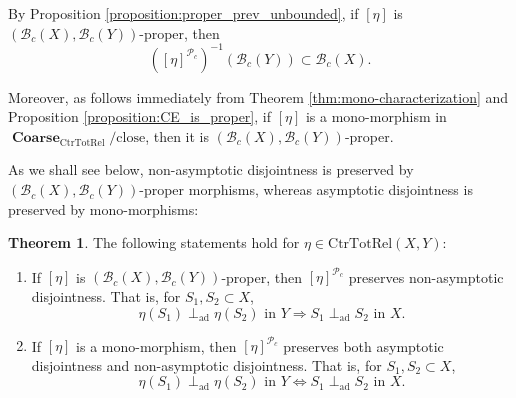 \documentclass[12pt, a4paper]{amsart}
\theoremstyle{definition}
\newtheorem{theorem}{Theorem}[section]
\newcommand{\Coarse}{\mathop{\mathbf{Coarse}}\nolimits}
\newcommand{\CtrTotRel}{\mathrm{CtrTotRel}}
\newcommand{\close}{\mathrm{close}}
\newcommand{\adperp}{\mathrel{\perp_{\mathrm{ad}}}}
\begin{document}
By Proposition \ref{proposition:proper_prev_unbounded}, if $[\eta]$ is $(\mathcal{B}_c(X),\mathcal{B}_c(Y))$-proper, then
\[
([\eta]^{\mathcal{P}_c})^{-1}(\mathcal{B}_c(Y)) \subset \mathcal{B}_c(X).
\]

Moreover, as follows immediately from Theorem \ref{thm:mono-characterization} and Proposition \ref{proposition:CE_is_proper}, if $[\eta]$ is a mono-morphism in $\Coarse_{\CtrTotRel}/{\close}$, then it is $(\mathcal{B}_c(X),\mathcal{B}_c(Y))$-proper.


As we shall see below, non-asymptotic disjointness is preserved by $(\mathcal{B}_c(X),\mathcal{B}_c(Y))$-proper morphisms, whereas asymptotic disjointness is preserved by mono-morphisms:

\begin{theorem}\label{theorem:properAD}
The following statements hold for $\eta \in \CtrTotRel(X,Y)$:
\begin{enumerate}
    \item If $[\eta]$ is $(\mathcal{B}_c(X),\mathcal{B}_c(Y))$-proper, then $[\eta]^{\mathcal{P}_c}$ preserves non-asymptotic disjointness. That is, for $S_1,S_2 \subset X$,
    \[
    \eta(S_1) \adperp \eta(S_2) \text{ in } Y \Rightarrow S_1 \adperp S_2 \text{ in } X.
    \]
    \item If $[\eta]$ is a mono-morphism, then $[\eta]^{\mathcal{P}_c}$ preserves both asymptotic disjointness and non-asymptotic disjointness. That is, for $S_1,S_2 \subset X$,
    \[
    \eta(S_1) \adperp \eta(S_2) \text{ in } Y \Leftrightarrow S_1 \adperp S_2 \text{ in } X.
    \]
\end{enumerate}
\end{theorem}
\end{document}
